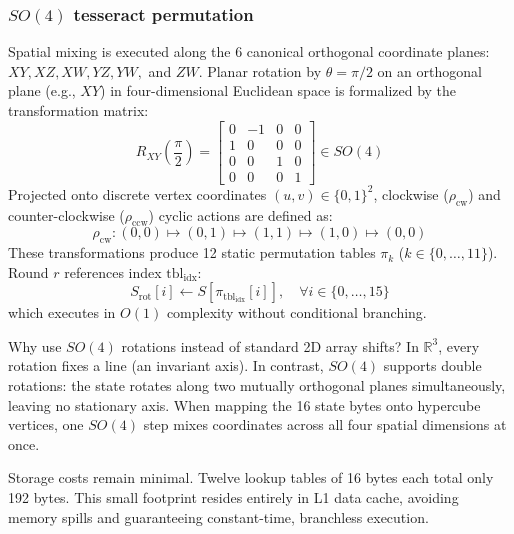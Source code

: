 \documentclass[10pt,twocolumn]{article}
\begin{document}
\subsubsection{$SO(4)$ tesseract permutation}
Spatial mixing is executed along the 6 canonical orthogonal coordinate planes: $XY, XZ, XW, YZ, YW,$ and $ZW$. Planar rotation by $\theta = \pi/2$ on an orthogonal plane (e.g., $XY$) in four-dimensional Euclidean space is formalized by the transformation matrix:
\begin{equation}
    R_{XY}\left(\frac{\pi}{2}\right) = \begin{bmatrix}
        0 & -1 & 0 & 0 \\
        1 & 0 & 0 & 0 \\
        0 & 0 & 1 & 0 \\
        0 & 0 & 0 & 1
    \end{bmatrix} \in SO(4)
\end{equation}
Projected onto discrete vertex coordinates $(u, v) \in \{0, 1\}^2$, clockwise ($\rho_{\text{cw}}$) and counter-clockwise ($\rho_{\text{ccw}}$) cyclic actions are defined as:
\begin{equation}
    \rho_{\text{cw}}: (0,0) \mapsto (0,1) \mapsto (1,1) \mapsto (1,0) \mapsto (0,0)
\end{equation}
These transformations produce 12 static permutation tables $\pi_k$ ($k \in \{0, \dots, 11\}$). Round $r$ references index $\text{tbl}_{\text{idx}}$:
\begin{equation}
    S_{\text{rot}}[i] \leftarrow S[\pi_{\text{tbl}_{\text{idx}}}[i]], \quad \forall i \in \{0, \dots, 15\}
\end{equation}
which executes in $O(1)$ complexity without conditional branching.

Why use $SO(4)$ rotations instead of standard 2D array shifts? In $\mathbb{R}^3$, every rotation fixes a line (an invariant axis). In contrast, $SO(4)$ supports double rotations: the state rotates along two mutually orthogonal planes simultaneously, leaving no stationary axis. When mapping the 16 state bytes onto hypercube vertices, one $SO(4)$ step mixes coordinates across all four spatial dimensions at once. 

Storage costs remain minimal. Twelve lookup tables of 16 bytes each total only 192 bytes. This small footprint resides entirely in L1 data cache, avoiding memory spills and guaranteeing constant-time, branchless execution.
\end{document}
